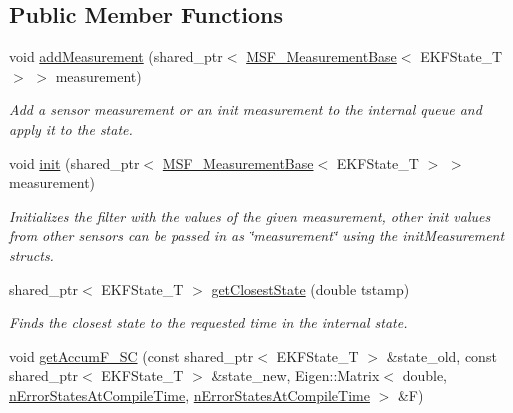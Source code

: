 \subsection*{Public Member Functions}
\begin{DoxyCompactItemize}
\item 
void \hyperlink{classmsf__core_1_1MSF__Core_ac4b9bb4a30b0e1817a5cd07e843d6723}{add\-Measurement} (shared\-\_\-ptr$<$ \hyperlink{classmsf__core_1_1MSF__MeasurementBase}{M\-S\-F\-\_\-\-Measurement\-Base}$<$ E\-K\-F\-State\-\_\-\-T $>$ $>$ measurement)
\begin{DoxyCompactList}\small\item\em Add a sensor measurement or an init measurement to the internal queue and apply it to the state. \end{DoxyCompactList}\item 
void \hyperlink{classmsf__core_1_1MSF__Core_a68e27c538b3c7a255d1b5260ca00b52e}{init} (shared\-\_\-ptr$<$ \hyperlink{classmsf__core_1_1MSF__MeasurementBase}{M\-S\-F\-\_\-\-Measurement\-Base}$<$ E\-K\-F\-State\-\_\-\-T $>$ $>$ measurement)
\begin{DoxyCompactList}\small\item\em Initializes the filter with the values of the given measurement, other init values from other sensors can be passed in as \char`\"{}measurement\char`\"{} using the init\-Measurement structs. \end{DoxyCompactList}\item 
shared\-\_\-ptr$<$ E\-K\-F\-State\-\_\-\-T $>$ \hyperlink{classmsf__core_1_1MSF__Core_acc5117f9c7f79d9114a63033cbdeb9cb}{get\-Closest\-State} (double tstamp)
\begin{DoxyCompactList}\small\item\em Finds the closest state to the requested time in the internal state. \end{DoxyCompactList}\item 
\hypertarget{classmsf__core_1_1MSF__Core_af7d1cc22cc28fd4ccabda47cd2ff5888}{void \hyperlink{classmsf__core_1_1MSF__Core_af7d1cc22cc28fd4ccabda47cd2ff5888}{get\-Accum\-F\-\_\-\-S\-C} (const shared\-\_\-ptr$<$ E\-K\-F\-State\-\_\-\-T $>$ \&state\-\_\-old, const shared\-\_\-ptr$<$ E\-K\-F\-State\-\_\-\-T $>$ \&state\-\_\-new, Eigen\-::\-Matrix$<$ double, \hyperlink{classmsf__core_1_1MSF__Core_a2bca35a2fba08b2fd5cc9963acc9c505afd5aaa703aae2fc6f022eec724b358f6}{n\-Error\-States\-At\-Compile\-Time}, \hyperlink{classmsf__core_1_1MSF__Core_a2bca35a2fba08b2fd5cc9963acc9c505afd5aaa703aae2fc6f022eec724b358f6}{n\-Error\-States\-At\-Compile\-Time} $>$ \&F)}\label{classmsf__core_1_1MSF__Core_af7d1cc22cc28fd4ccabda47cd2ff5888}


\end{DoxyCompactItemize}
